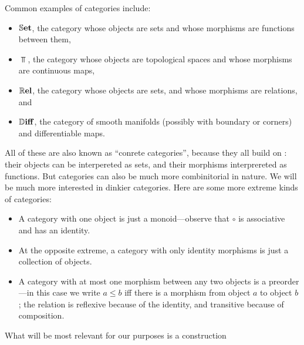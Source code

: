 Common examples of categories include:
\begin{itemize}[left=0pt,noitemsep,topsep=0pt]
\item    
 $\mathbb{S}\mathbf{et}$, the category whose objects are sets and whose morphisms are functions between them,  

\item 
$\Top$, the category whose objects are topological spaces and whose morphisms are continuous maps,

\item 
$\mathbb{R}\mathbf{el}$, the category whose objects are sets, and whose morphisms are relations, and

\item $\mathbb{D}\mathbf{iff}$, the category of smooth manifolds (possibly with boundary or corners) and differentiable maps. 

\end{itemize}

All of these are also known as ``conrete categories'', because they all build on \Set: their objects can be interpereted as sets, and their morphisms interprereted as functions. 
But categories can also be much more combinitorial in nature. 
We will be much more interested in dinkier categories.
Here are some more extreme kinds of categories:

\begin{itemize}[]
    \item A category with one object is just a monoid---observe that $\circ$ is associative and has an identity. 
    
    \item At the opposite extreme, a category with only identity morphisms is just a collection of objects. 
    
    \item A category with at most one morphism between any two objects is a preorder---in this case we write $a \le b$ iff there is a morphism from object $a$ to object $b$; the relation is reflexive because of the identity, and transitive because of composition. 
\end{itemize}

What will be most relevant for our purposes is a construction 

